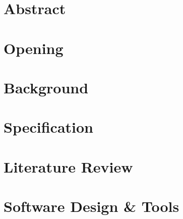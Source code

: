 \documentclass[12pt, a4paper, twoside]{book}
\begin{document}
\pagestyle{empty}


\fancyhead{}
\fancyhead[LO]{\leftmark}
\fancyhead[RE]{\leftmark}
\setlength{\headheight}{15pt}
\renewcommand{\headrulewidth}{0.4pt}
\renewcommand{\footrulewidth}{0.4pt}
\renewcommand{\chaptermark}[1]{%
\markboth{#1}{}}

\chapter{Abstract}



\clearpage

\tableofcontents
{}
\clearpage

\listoffigures
{}
\clearpage

\listoftables
{}
\clearpage

\printglossary[title=Acronyms, toctitle=Acronyms]
\clearpage

\mainmatter

\pagestyle{fancy}

\chapter{Opening}
\label{chp:opening}

    
\chapter{Background}
\label{chp:background}

    
\chapter{Specification}
\label{chp:specification}

    
\chapter{Literature Review}
\label{chp:literature_review}


\chapter{Software Design \& Tools}
\label{chp:software_design}

\end{document}
